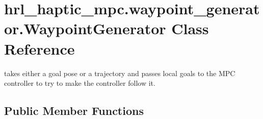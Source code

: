 \hypertarget{classhrl__haptic__mpc_1_1waypoint__generator_1_1_waypoint_generator}{\section{hrl\-\_\-haptic\-\_\-mpc.\-waypoint\-\_\-generator.\-Waypoint\-Generator \-Class \-Reference}
\label{classhrl__haptic__mpc_1_1waypoint__generator_1_1_waypoint_generator}
}


takes either a goal pose or a trajectory and passes local goals to the \-M\-P\-C controller to try to make the controller follow it.  


\subsection*{\-Public \-Member \-Functions}
